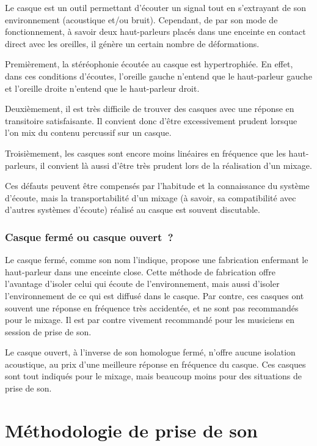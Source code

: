 \documentclass[
]{book}
\begin{document}
Le casque est un outil permettant d'écouter un signal tout en s'extrayant de son environnement (acoustique et/ou bruit). Cependant, de par son mode de fonctionnement, à savoir deux haut-parleurs placés dans une enceinte en contact direct avec les oreilles, il génère un certain nombre de déformations.

Premièrement, la stéréophonie écoutée au casque est hypertrophiée. En effet, dans ces conditions d'écoutes, l'oreille gauche n'entend que le haut-parleur gauche et l'oreille droite n'entend que le haut-parleur droit.

Deuxièmement, il est très difficile de trouver des casques avec une réponse en transitoire satisfaisante. Il convient donc d'être excessivement prudent lorsque l'on mix du contenu percussif sur un casque.

Troisièmement, les casques sont encore moins linéaires en fréquence que les haut-parleurs, il convient là aussi d'être très prudent lors de la réalisation d'un mixage.

Ces défauts peuvent être compensés par l'habitude et la connaissance du système d'écoute, mais la transportabilité d'un mixage (à savoir, sa compatibilité avec d'autres systèmes d'écoute) réalisé au casque est souvent discutable.

\hypertarget{casque-fermuxe9-ou-casque-ouvert}{%
\section{Casque fermé ou casque ouvert~?}\label{casque-fermuxe9-ou-casque-ouvert}}

Le casque fermé, comme son nom l'indique, propose une fabrication enfermant le haut-parleur dans une enceinte close. Cette méthode de fabrication offre l'avantage d'isoler celui qui écoute de l'environnement, mais aussi d'isoler l'environnement de ce qui est diffusé dans le casque. Par contre, ces casques ont souvent une réponse en fréquence très accidentée, et ne sont pas recommandés pour le mixage. Il est par contre vivement recommandé pour les musiciens en session de prise de son.

Le casque ouvert, à l'inverse de son homologue fermé, n'offre aucune isolation acoustique, au prix d'une meilleure réponse en fréquence du casque. Ces casques sont tout indiqués pour le mixage, mais beaucoup moins pour des situations de prise de son.

\hypertarget{part-muxe9thodologie-de-prise-de-son}{%
\part{Méthodologie de prise de son}\label{part-muxe9thodologie-de-prise-de-son}}
\end{document}
